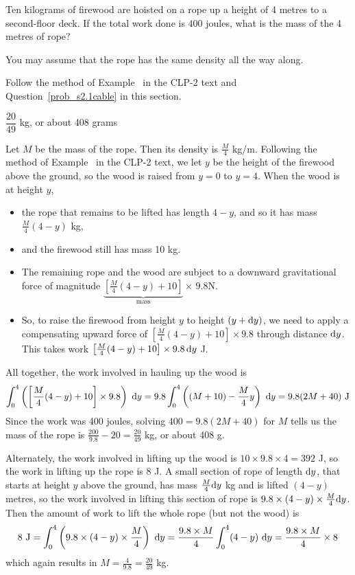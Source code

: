 \begin{Mquestion}\label{prob_s2.1firewood}
Ten kilograms of firewood are hoisted on a rope up a height of 4 metres to a second-floor deck. If
the total work done is $400$ joules, what is the mass of the 4 metres of rope?

You may assume that the rope has the same density all the way along.
\end{Mquestion}
\begin{hint}
Follow the method of Example~ in the CLP-2 text and Question~\ref{prob_s2.1cable} in this section.
\end{hint}
\begin{answer}
$\dfrac{20}{49}$ kg, or about 408 grams
\end{answer}
\begin{solution}
Let $M$ be the mass of the rope. Then its density is $\frac{M}{4}$ kg/m. Following the method of Example~ in the CLP-2 text, we let $y$ be the height of the firewood above the ground, so the wood is raised from $y=0$ to $y=4$. When the wood is at height $y$,
\begin{itemize}
\item the rope that remains to be lifted has length $4-y$, and so it has mass $\frac{M}{4}(4-y) $ kg,
\item and the firewood still has mass 10 kg.
\item The remaining rope and the wood are subject to a downward gravitational force of magnitude $\underbrace{\left[\frac{M}{4}(4-y)+10\right]}_{\text{mass}}\times\, 9.8$\quad N.
\item So, to raise the firewood from height $y$ to height $(y+\mathrm{d}y)$, we need to apply a compensating upward force of $\left[\frac{M}{4}(4-y)+10\right]\times 9.8$ through distance $\mathrm{d}y$. This takes work $\left[\frac{M}{4}(4-y)+10\right]\times 9.8\,\mathrm{d}y$ J.
\end{itemize}
All together, the work involved in hauling up the wood is
\[\int_0^4\left(\left[\frac{M}{4}(4-y)+10\right]\times 9.8\right)\ \mathrm{d}y =
9.8\int_0^4\left((M+10) - \frac{M}{4}y\right)\ \mathrm{d}y=9.8(2M+40) \text{ J}\]
Since the work was 400 joules, solving $400=9.8(2M+40)$ for $M$ tells us the mass of the rope is $\frac{200}{9.8}-20 = \frac{20}{49}$ kg, or about 408 g.

Alternately, the work involved in lifting up the wood is $10\times 9.8 \times 4 = 392$ J, so the work in lifting up the rope is 8 J. A small section of rope of length $\mathrm{d}y$, that starts at height $y$ above the ground, has mass $\frac{M}{4}\mathrm{d}y$ kg and is lifted $(4-y)$ metres, so the work involved in lifting this section of rope is $9.8 \times (4-y) \times \frac{M}{4}\mathrm{d}y$. Then the amount of work to lift the whole rope (but not the wood) is
\[8 \text{ J} = \int_0^4 \left(9.8 \times (4-y) \times \frac{M}{4}\right)\ \mathrm{d}y  = \frac{9.8 \times M}{4}\int_0^4 (4-y)\ \mathrm{d}y = \frac{9.8 \times M}{4}\times 8\]
which again results in $M = \frac{4}{9.8}=\frac{20}{49}$ kg.
\end{solution}


